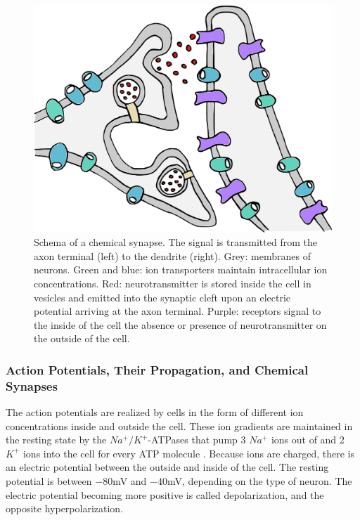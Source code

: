 \begin{figure}[t]
\begin{centering}
\includegraphics[width=0.8\columnwidth]{images/synapse}
\par\end{centering}
\caption[Schema of a chemical synapse.]{\label{fig:Schema-of-chemical-synapse}Schema of a chemical synapse.
The signal is transmitted from the axon terminal (left) to the dendrite
(right). Grey: membranes of neurons. Green and blue: ion transporters
maintain intracellular ion concentrations. Red: neurotransmitter is
stored inside the cell in vesicles and emitted into the synaptic cleft
upon an electric potential arriving at the axon terminal. Purple:
receptors signal to the inside of the cell the absence or presence
of neurotransmitter on the outside of the cell.}
\end{figure}

\subsubsection{Action Potentials, Their Propagation, and Chemical Synapses }

The action potentials are realized by cells in the form of different
ion concentrations inside and outside the cell. These ion gradients
are maintained in the resting state by the $Na^{+}/K^{+}$-ATPases
that pump 3 $Na^{+}$ ions out of and 2 $K^{+}$ ions into the cell
for every ATP molecule \cite{LodishZipursky2000}. Because ions are
charged, there is an electric potential between the outside and inside
of the cell. The resting potential is between $-80$mV and $-40$mV,
depending on the type of neuron. The electric potential becoming more
positive is called depolarization, and the opposite hyperpolarization.

